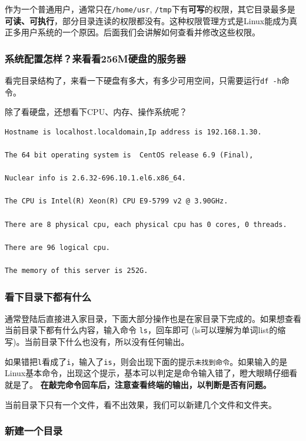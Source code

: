 \documentclass[]{article}
\numberwithin{figure}{section}
\numberwithin{table}{section}
\begin{document}
作为一个普通用户，通常只在\texttt{/home/usr}, \texttt{/tmp}下有\textbf{可写}的权限，其它目录最多是\textbf{可读、可执行}，部分目录连读的权限都没有。这种权限管理方式是Linux能成为真正多用户系统的一个原因。后面我们会讲解如何查看并修改这些权限。

\hypertarget{linux_system_hardware}{%
\subsubsection{系统配置怎样？来看看256M硬盘的服务器}\label{linux_system_hardware}}

看完目录结构了，来看一下硬盘有多大，有多少可用空间，只需要运行\texttt{df\ -h}命令。

除了看硬盘，还想看下CPU、内存、操作系统呢？

\begin{verbatim}
Hostname is localhost.localdomain,Ip address is 192.168.1.30.

The 64 bit operating system is  CentOS release 6.9 (Final), 
	
Nuclear info is 2.6.32-696.10.1.el6.x86_64.

The CPU is Intel(R) Xeon(R) CPU E9-5799 v2 @ 3.90GHz.

There are 8 physical cpu, each physical cpu has 0 cores, 0 threads.

There are 96 logical cpu.

The memory of this server is 252G.
\end{verbatim}

\hypertarget{directpry_show}{%
\subsubsection{看下目录下都有什么}\label{directpry_show}}

通常登陆后直接进入家目录，下面大部分操作也是在家目录下完成的。如果想查看当前目录下都有什么内容，输入命令 \texttt{ls}，回车即可 (ls可以理解为单词list的缩写)。当前目录下什么也没有，所以没有任何输出。

如果错把\texttt{l}看成了\texttt{i}，输入了\texttt{is}，则会出现下面的提示\texttt{未找到命令}。如果输入的是Linux基本命令，出现这个提示，基本可以判定是命令输入错了，瞪大眼睛仔细看就是了。 \textbf{在敲完命令回车后，注意查看终端的输出，以判断是否有问题。}

当前目录下只有一个文件，看不出效果，我们可以新建几个文件和文件夹。

\hypertarget{mkdir}{%
\subsubsection{新建一个目录}\label{mkdir}}
\end{document}
